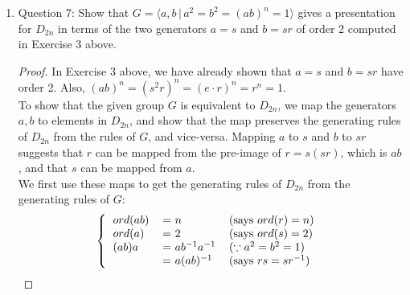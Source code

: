\documentclass{article}
\begin{document}
\begin{enumerate}
\begin{enumerate}
\begin{proof}
          We show by induction on $k$ that all such elements $sr^k$ have
          order 2. The base case is true since $s$ has order 2. For the
          inductive step,
          \begin{align*}
            (sr^{k+1})^2  &= sr^{k+1}sr^{k+1}     && \\
                          &= sr^k(rs)r^{k+1}      && \\
                          &= sr^k(sr^{-1})r^{k+1} && (rs=sr^{-1}) \\
                          &= sr^ksr^k             && \\
                          &= (sr^k)(sr^k)         && \\
                          &= (sr^k)^2             && \\
                          &= e                    && \text{(induction).} \\
          \end{align*}
        \end{proof}
      \item Question 7: Show that $G=\langle a,b\,|\,
        a^2=b^2=(ab)^n=1\rangle$
        gives a presentation for $D_{2n}$ in terms of the two generators
        $a=s$ and $b=sr$ of order 2 computed in Exercise 3 above.
        \begin{proof}
          In Exercise 3 above, we have already shown that $a=s$ and $b=sr$
          have order 2. Also, $(ab)^n=(s^2r)^n=(e\cdot r)^n=r^n=1$. \\

          To show that the given group $G$ is equivalent to $D_{2n}$, we map
          the generators $a,b$ to elements in $D_{2n}$, and show that the
          map preserves the generating rules of $D_{2n}$ from
          the rules of $G$, and vice-versa. Mapping $a$ to $s$ and $b$ to
          $sr$ suggests that $r$ can be mapped from the pre-image of
          $r=s(sr)$, which is $ab$, and that $s$ can be mapped from $a$. \\

          We first use these maps to get the generating rules of $D_{2n}$
          from the generating rules of $G$:
          \[\left \{
            \begin{tabular}{lll}
              $ord(ab)$ & = $n$             & (says $ord(r)=n$) \\
              $ord(a)$  & = $2$             & (says $ord(s)=2$) \\
              $(ab)a$   & = $ab^{-1}a^{-1}$ & ($\because a^2=b^2=1$) \\
                        & = $a(ab)^{-1}$    & (says $rs=sr^{-1}$) \\
            \end{tabular}
          \right .\ \]


\end{proof}
\end{enumerate}
\end{enumerate}
\end{document}
